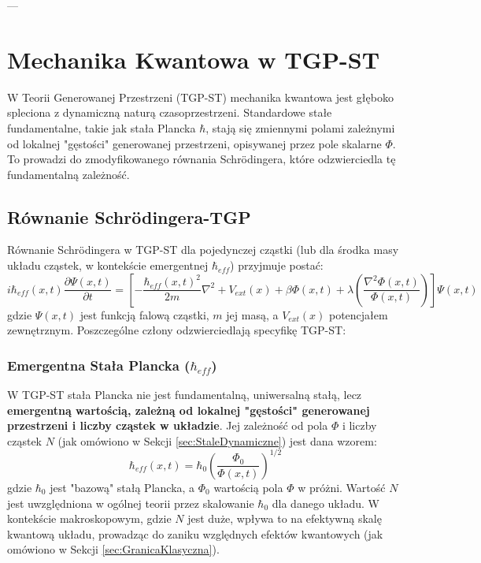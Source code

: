 \documentclass[11pt,a4paper]{article}
\begin{document}
---

\section{Mechanika Kwantowa w TGP-ST}
\label{sec:MechanikaKwantowa}

W Teorii Generowanej Przestrzeni (TGP-ST) mechanika kwantowa jest głęboko spleciona z dynamiczną naturą czasoprzestrzeni. Standardowe stałe fundamentalne, takie jak stała Plancka $\hbar$, stają się zmiennymi polami zależnymi od lokalnej "gęstości" generowanej przestrzeni, opisywanej przez pole skalarne $\Phi$. To prowadzi do zmodyfikowanego równania Schrödingera, które odzwierciedla tę fundamentalną zależność.

\subsection{Równanie Schrödingera-TGP}
Równanie Schrödingera w TGP-ST dla pojedynczej cząstki (lub dla środka masy układu cząstek, w kontekście emergentnej $\hbar_{eff}$) przyjmuje postać:
\begin{equation}
    i\hbar_{eff}(x,t)\frac{\partial\Psi(x,t)}{\partial t}=\left[-\frac{\hbar_{eff}(x,t)^2}{2m}\nabla^2+V_{ext}(x)+\beta\Phi(x,t)+\lambda\left(\frac{\nabla^2\Phi(x,t)}{\Phi(x,t)}\right)\right]\Psi(x,t)
    \label{eq:SchrodingerTGP}
\end{equation}
gdzie $\Psi(x,t)$ jest funkcją falową cząstki, $m$ jej masą, a $V_{ext}(x)$ potencjałem zewnętrznym. Poszczególne człony odzwierciedlają specyfikę TGP-ST:

\subsubsection{Emergentna Stała Plancka ($\hbar_{eff}$)}
W TGP-ST stała Plancka nie jest fundamentalną, uniwersalną stałą, lecz \textbf{emergentną wartością, zależną od lokalnej "gęstości" generowanej przestrzeni i liczby cząstek w układzie}. Jej zależność od pola $\Phi$ i liczby cząstek $N$ (jak omówiono w Sekcji \ref{sec:StaleDynamiczne}) jest dana wzorem:
\begin{equation}
    \hbar_{eff}(x,t)=\hbar_0 \left(\frac{\Phi_0}{\Phi(x,t)}\right)^{1/2}
    \label{eq:h_eff}
\end{equation}
gdzie $\hbar_0$ jest "bazową" stałą Plancka, a $\Phi_0$ wartością pola $\Phi$ w próżni. Wartość $N$ jest uwzględniona w ogólnej teorii przez skalowanie $\hbar_0$ dla danego układu. W kontekście makroskopowym, gdzie $N$ jest duże, wpływa to na efektywną skalę kwantową układu, prowadząc do zaniku względnych efektów kwantowych (jak omówiono w Sekcji \ref{sec:GranicaKlasyczna}).
\end{document}
